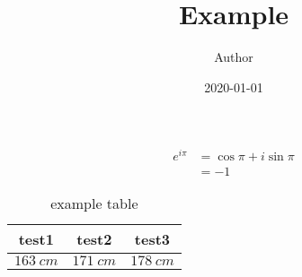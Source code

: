 \documentclass[a4paper,11pt,xelatex,ja=standard]{bxjsarticle}
\title{Example}
\author{Author}
\date{2020-01-01}
\begin{document}
\maketitle
\begin{align}
e^{i\pi} &= \cos{\pi} + i\sin{\pi}\\
&=-1
\end{align}
\begin{table}[hbtp]
\centering
\caption{example table}
\begin{tabular}{ccc}
\hline
test1 & test2 & test3 \\
\hline \hline
$\SI{163}{cm}$ & $\SI{171}{cm}$ & $\SI{178}{cm}$ \\
\hline
\end{tabular}
\end{table}
\end{document}
